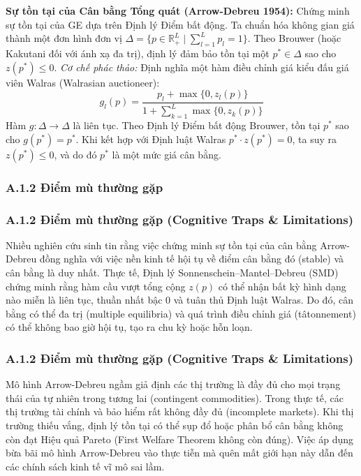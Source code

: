 \documentclass[
]{article}
\begin{document}
\textbf{Sự tồn tại của Cân bằng Tổng quát (Arrow-Debreu 1954):} Chứng
minh sự tồn tại của GE dựa trên Định lý Điểm bất động. Ta chuẩn hóa
không gian giá thành một đơn hình đơn vị
\(\Delta = \{ p \in \mathbb{R}^L_+ \mid \sum_{l=1}^L p_l = 1 \}\). Theo
Brouwer (hoặc Kakutani đối với ánh xạ đa trị), định lý đảm bảo tồn tại
một \(p^* \in \Delta\) sao cho \(z(p^*) \leq 0\). \emph{Cơ chế phác
thảo:} Định nghĩa một hàm điều chỉnh giá kiểu đấu giá viên Walras
(Walrasian auctioneer):
\[ g_l(p) = \frac{p_l + \max\{0, z_l(p)\}}{1 + \sum_{k=1}^L \max\{0, z_k(p)\}} \]
Hàm \(g: \Delta \to \Delta\) là liên tục. Theo Định lý Điểm bất động
Brouwer, tồn tại \(p^*\) sao cho \(g(p^*) = p^*\). Khi kết hợp với Định
luật Walras \(p^* \cdot z(p^*) = 0\), ta suy ra \(z(p^*) \leq 0\), và do
đó \(p^*\) là một mức giá cân bằng.

\subsubsection{A.1.2 Điểm mù thường
gặp}\label{a.1.2-ux111iux1ec3m-muxf9-thux1b0ux1eddng-gux1eb7p}

\subsubsection{A.1.2 Điểm mù thường gặp (Cognitive Traps \&
Limitations)}\label{a.1.2-ux111iux1ec3m-muxf9-thux1b0ux1eddng-gux1eb7p-cognitive-traps-limitations}

Nhiều nghiên cứu sinh tin rằng việc chứng minh sự tồn tại của cân bằng
Arrow-Debreu đồng nghĩa với việc nền kinh tế hội tụ về điểm cân bằng đó
(stable) và cân bằng là duy nhất. Thực tế, Định lý
Sonnenschein--Mantel--Debreu (SMD) chứng minh rằng hàm cầu vượt tổng
cộng \(z(p)\) có thể nhận bất kỳ hình dạng nào miễn là liên tục, thuần
nhất bậc 0 và tuân thủ Định luật Walras. Do đó, cân bằng có thể đa trị
(multiple equilibria) và quá trình điều chỉnh giá (tâtonnement) có thể
không bao giờ hội tụ, tạo ra chu kỳ hoặc hỗn loạn.

\subsubsection{A.1.2 Điểm mù thường gặp (Cognitive Traps \&
Limitations)}\label{a.1.2-ux111iux1ec3m-muxf9-thux1b0ux1eddng-gux1eb7p-cognitive-traps-limitations-1}

Mô hình Arrow-Debreu ngầm giả định các thị trường là đầy đủ cho mọi
trạng thái của tự nhiên trong tương lai (contingent commodities). Trong
thực tế, các thị trường tài chính và bảo hiểm rất không đầy đủ
(incomplete markets). Khi thị trường thiếu vắng, định lý tồn tại có thể
sụp đổ hoặc phân bổ cân bằng không còn đạt Hiệu quả Pareto (First
Welfare Theorem không còn đúng). Việc áp dụng bừa bãi mô hình
Arrow-Debreu vào thực tiễn mà quên mất giới hạn này dẫn đến các chính
sách kinh tế vĩ mô sai lầm.
\end{document}
